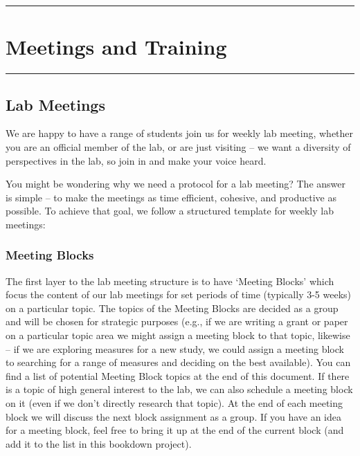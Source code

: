 \documentclass[]{book}
\begin{document}
\begin{center}\rule{0.5\linewidth}{\linethickness}\end{center}

\hypertarget{meetings-and-training}{%
\section{Meetings and Training}\label{meetings-and-training}}

\begin{center}\rule{0.5\linewidth}{\linethickness}\end{center}

\hypertarget{lab-meetings}{%
\subsection{Lab Meetings}\label{lab-meetings}}

We are happy to have a range of students join us for weekly lab meeting, whether you are an official member of the lab, or are just visiting -- we want a diversity of perspectives in the lab, so join in and make your voice heard.

You might be wondering why we need a protocol for a lab meeting? The answer is simple -- to make the meetings as time efficient, cohesive, and productive as possible. To achieve that goal, we follow a structured template for weekly lab meetings:

\hypertarget{meeting-blocks}{%
\subsubsection{Meeting Blocks}\label{meeting-blocks}}

The first layer to the lab meeting structure is to have `Meeting Blocks' which focus the content of our lab meetings for set periods of time (typically 3-5 weeks) on a particular topic. The topics of the Meeting Blocks are decided as a group and will be chosen for strategic purposes (e.g., if we are writing a grant or paper on a particular topic area we might assign a meeting block to that topic, likewise -- if we are exploring measures for a new study, we could assign a meeting block to searching for a range of measures and deciding on the best available). You can find a list of potential Meeting Block topics at the end of this document. If there is a topic of high general interest to the lab, we can also schedule a meeting block on it (even if we don't directly research that topic). At the end of each meeting block we will discuss the next block assignment as a group. If you have an idea for a meeting block, feel free to bring it up at the end of the current block (and add it to the list in this bookdown project).
\end{document}
